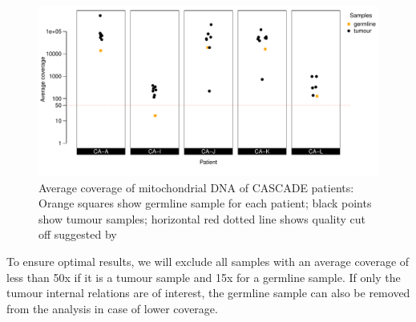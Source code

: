 \begin{figure}[!ht]
\centering
\includegraphics[width=.99\linewidth]{Figures/mtCoverage}
\vspace{-1em}
\caption[Average coverage of mitochondrial DNA of CASCADE patients]{Average coverage of mitochondrial DNA of CASCADE patients: Orange squares show germline sample for each patient; black points show tumour samples; horizontal red dotted line shows quality cut off suggested by \protect\textcite{Ludwig2019}} \label{fig:cas86schematic}
\end{figure}

To ensure optimal results, we will exclude all samples with an average coverage of less than 50x if it is a tumour sample and 15x for a germline sample. If only the tumour internal relations are of interest, the germline sample can also be removed from the analysis in case of lower coverage.
